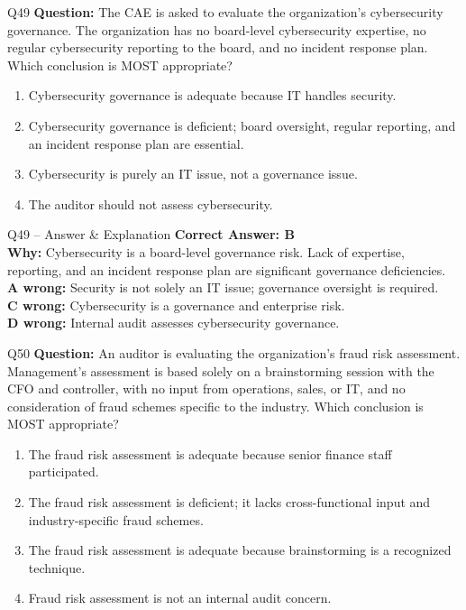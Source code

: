 \documentclass[aspectratio=169,10pt]{beamer}
\begin{document}
	\begin{frame}[t]{Q49}
		\small
		\textbf{Question:} The CAE is asked to evaluate the organization's cybersecurity governance. The organization has no board-level cybersecurity expertise, no regular cybersecurity reporting to the board, and no incident response plan. Which conclusion is MOST appropriate?
		\begin{enumerate}[label=\Alph*.,itemsep=1pt,topsep=2pt]
			\item Cybersecurity governance is adequate because IT handles security.
			\item Cybersecurity governance is deficient; board oversight, regular reporting, and an incident response plan are essential.
			\item Cybersecurity is purely an IT issue, not a governance issue.
			\item The auditor should not assess cybersecurity.
		\end{enumerate}
	\end{frame}
	
	\begin{frame}[t]{Q49 -- Answer \& Explanation}
		\small
		\textbf{Correct Answer: B} \\[4pt]
		\textbf{Why:} Cybersecurity is a board-level governance risk. Lack of expertise, reporting, and an incident response plan are significant governance deficiencies. \\[4pt]
		\textbf{A wrong:} Security is not solely an IT issue; governance oversight is required. \\[2pt]
		\textbf{C wrong:} Cybersecurity is a governance and enterprise risk. \\[2pt]
		\textbf{D wrong:} Internal audit assesses cybersecurity governance.
	\end{frame}
	
	\begin{frame}[t]{Q50}
		\small
		\textbf{Question:} An auditor is evaluating the organization's fraud risk assessment. Management's assessment is based solely on a brainstorming session with the CFO and controller, with no input from operations, sales, or IT, and no consideration of fraud schemes specific to the industry. Which conclusion is MOST appropriate?
		\begin{enumerate}[label=\Alph*.,itemsep=1pt,topsep=2pt]
			\item The fraud risk assessment is adequate because senior finance staff participated.
			\item The fraud risk assessment is deficient; it lacks cross-functional input and industry-specific fraud schemes.
			\item The fraud risk assessment is adequate because brainstorming is a recognized technique.
			\item Fraud risk assessment is not an internal audit concern.
		\end{enumerate}
	\end{frame}
	
\end{document}
